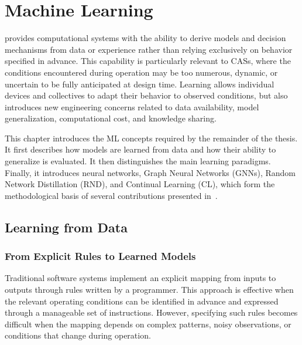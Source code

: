 
\chapter{Machine Learning}
\label{chap:ml}
\minitoc

 provides computational systems with the ability 
 to derive models and decision mechanisms from data or experience rather than 
 relying exclusively on behavior specified in advance.
%
This capability is particularly relevant to \glspl{CAS},
 where the conditions encountered during operation may be too numerous, dynamic,
 or uncertain to be fully anticipated at design time.
%
Learning allows individual devices and collectives to adapt their behavior to observed conditions, 
 but also introduces new engineering concerns related to data availability, 
 model generalization, computational cost, and knowledge sharing.

This chapter introduces the \gls{ML} concepts required by the remainder of the thesis.
%
It first describes how models are learned from data 
 and how their ability to generalize is evaluated.
%
It then distinguishes the main learning paradigms.
%
Finally, 
 it introduces neural networks, Graph Neural Networks (GNNs), 
 Random Network Distillation (RND), and 
 Continual Learning (CL), 
 which form the methodological basis of several contributions 
 presented in~.

\section{Learning from Data}
\label{sec:learning-from-data}

\subsection{From Explicit Rules to Learned Models}
\label{subsec:rules-to-models}

Traditional software systems implement an explicit mapping from inputs to
outputs through rules written by a programmer.
%
This approach is effective when the relevant operating conditions can be
identified in advance and expressed through a manageable set of instructions.
%
However, specifying such rules becomes difficult when the mapping depends on
complex patterns, noisy observations, or conditions that change during
operation.

